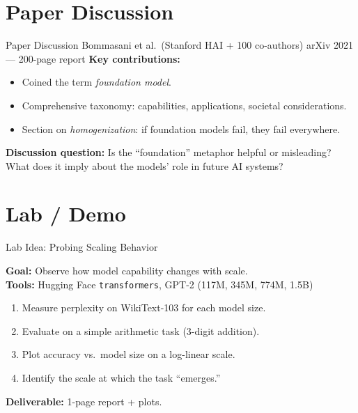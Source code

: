 \documentclass[aspectratio=169,10pt]{beamer}
\begin{document}
\section{Paper Discussion}

\begin{frame}{Paper Discussion}
    {Bommasani et al.\ (Stanford HAI + 100 co-authors)}
    {arXiv 2021 — 200-page report}
  \vspace{0.5em}
  \textbf{Key contributions:}
  \begin{itemize}
    \item Coined the term \emph{foundation model}.
    \item Comprehensive taxonomy: capabilities, applications, societal considerations.
    \item Section on \emph{homogenization}: if foundation models fail, they fail everywhere.
  \end{itemize}
  \vspace{0.3em}
  \textbf{Discussion question:} Is the ``foundation'' metaphor helpful or misleading?\\
  What does it imply about the models' role in future AI systems?
\end{frame}

\section{Lab / Demo}

\begin{frame}{Lab Idea: Probing Scaling Behavior}
  \begin{tcolorbox}[hitbox, title=Lab 1 — Scaling and Emergence]
    \textbf{Goal:} Observe how model capability changes with scale.\\[4pt]
    \textbf{Tools:} Hugging Face \texttt{transformers}, GPT-2 (117M, 345M, 774M, 1.5B)
    \begin{enumerate}
      \item Measure perplexity on WikiText-103 for each model size.
      \item Evaluate on a simple arithmetic task (3-digit addition).
      \item Plot accuracy vs.\ model size on a log-linear scale.
      \item Identify the scale at which the task ``emerges.''
    \end{enumerate}
    \textbf{Deliverable:} 1-page report + plots.
  \end{tcolorbox}
\end{frame}
\end{document}
